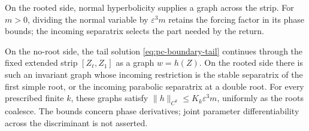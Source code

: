 On the rooted side, normal hyperbolicity supplies a graph across the
strip. For $m>0$, dividing the normal variable by $\varepsilon^3m$
retains the forcing factor in its phase bounds; the incoming separatrix
selects the
part needed by the return.

\begin{lemma}\label{lem:pc-selected-graph}
On the no-root side, the tail solution
\eqref{eq:pc-boundary-tail} continues through the fixed extended strip
$[Z_\ell,Z_1]$ as a graph $w=h(Z)$. On the rooted side there is such an
invariant graph whose incoming restriction is the stable separatrix
of the first simple root, or the incoming parabolic separatrix at
a double root. For every prescribed finite $k$, these graphs satisfy
$\|h\|_{C^k}\le K_k\varepsilon^3m$, uniformly as the roots coalesce.
The bounds concern phase derivatives; joint parameter differentiability
across the discriminant is not asserted.
\end{lemma}


